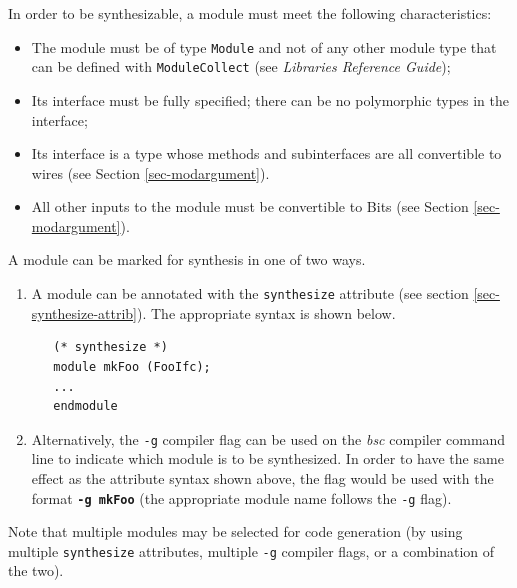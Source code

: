 \documentclass[twoside,letterpaper]{article}
\newcommand{\LibRefGuide}{\emph{Libraries Reference Guide}}
\newcommand{\bsc}{\emph{bsc}}
\newcommand{\te}[1]{\texttt{#1}}
\begin{document}
In order to be synthesizable, a module must meet the following 
characteristics:
\begin{itemize}

\item The module must be of type \te{Module} and not of any other
  module type that can be defined with \te{ModuleCollect} (see
  {\LibRefGuide});

\item Its interface must be fully specified; there can be no
polymorphic types in the interface;

\item Its interface is a type whose methods and subinterfaces are all
convertible to wires (see Section \ref{sec-modargument}).

\item All other inputs to the module must be convertible to Bits (see
Section \ref{sec-modargument}).

\end{itemize}

A module can be marked for synthesis in one of two ways.

\begin{enumerate}
\item A module can be annotated with the \te{synthesize} attribute (see section
\ref{sec-synthesize-attrib}). The appropriate syntax is shown below.

\begin{verbatim}
   (* synthesize *)
   module mkFoo (FooIfc);
   ...
   endmodule
\end{verbatim}

\item Alternatively, the \te{-g} compiler flag can be used on the
  {\bsc} compiler command line to indicate which module is to be
  synthesized. In order to have the same effect as the attribute
  syntax shown above, the flag would be used with the format
  \mbox{{\bf\tt -g mkFoo}} (the appropriate module name follows the
  \te{-g} flag).

\end{enumerate}

Note that multiple modules may be selected for code generation (by
using multiple \te{synthesize} attributes, multiple \te{-g} compiler
flags, or a combination of the two).
\end{document}
